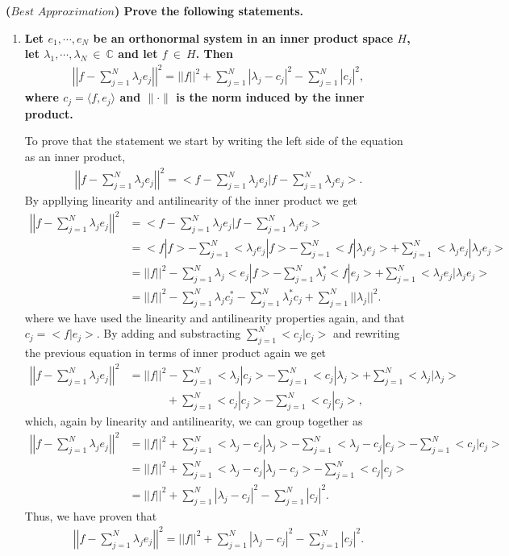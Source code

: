\textbf{($\textit{Best Approximation}$) Prove the following statements.}
\begin{enumerate}[label=(\alph*)]
\item \textbf{Let $e_1, \cdots, e_N$ be an orthonormal system in an inner product space $H$, let $\lambda_1, \cdots, \lambda_N~ \in ~ \mathbb{C}$ and let $f~\in~H$. Then
\begin{align*}
\left|\left|f-\sum_{j=1}^N\lambda_je_j\right|\right|^2=||f||^2+\sum_{j=1}^N|\lambda_j-c_j|^2-\sum_{j=1}^N|c_j|^2,
\end{align*}
where $c_j = \langle f,e_j \rangle$ and $\| \cdot \|$ is the norm induced by the inner product. }
\newline

To prove that the statement we start by writing the left side of the equation as an inner product,
\begin{align*}
\left|\left|f-\sum_{j=1}^N\lambda_je_j\right|\right|^2=<f-\sum_{j=1}^N\lambda_je_j|f-\sum_{j=1}^N\lambda_je_j>.
\end{align*}
By appllying linearity and antilinearity of the inner product we get
\begin{align*}
\left|\left|f-\sum_{j=1}^N\lambda_je_j\right|\right|^2&=<f-\sum_{j=1}^N\lambda_je_j|f-\sum_{j=1}^N\lambda_je_j>\\
&=<f|f>-\sum_{j=1}^N<\lambda_je_j|f>-\sum_{j=1}^N<f|\lambda_je_j>+\sum_{j=1}^N<\lambda_je_j|\lambda_je_j>\\
&=||f||^2-\sum_{j=1}^N\lambda_j<e_j|f>-\sum_{j=1}^N\lambda_j^*<f|e_j>+\sum_{j=1}^N<\lambda_je_j|\lambda_je_j>\\
&=||f||^2-\sum_{j=1}^N\lambda_jc_j^*-\sum_{j=1}^N\lambda_j^*c_j+\sum_{j=1}^N||\lambda_j||^2.
\end{align*}
where we have used the linearity and antilinearity properties again, and that $c_j=<f|e_j>$. By adding and substracting $\sum_{j=1}^N<c_j|c_j>$ and rewriting the previous equation in terms of inner product again we get
\begin{align*}
\left|\left|f-\sum_{j=1}^N\lambda_je_j\right|\right|^2&=||f||^2-\sum_{j=1}^N<\lambda_j|c_j>-\sum_{j=1}^N<c_j|\lambda_j>+\sum_{j=1}^N<\lambda_j|\lambda_j>\\
&~~~~~~~~~~~~~~~+\sum_{j=1}^N<c_j|c_j>-\sum_{j=1}^N<c_j|c_j>,
\end{align*}
which, again by linearity and antilinearity, we can group together as
\begin{align*}
\left|\left|f-\sum_{j=1}^N\lambda_je_j\right|\right|^2&=||f||^2+\sum_{j=1}^N<\lambda_j-c_j|\lambda_j>-\sum_{j=1}^N<\lambda_j-c_j|c_j>-\sum_{j=1}^N<c_j|c_j>\\
&=||f||^2+\sum_{j=1}^N<\lambda_j-c_j|\lambda_j-c_j>-\sum_{j=1}^N<c_j|c_j>\\
&=||f||^2+\sum_{j=1}^N|\lambda_j-c_j|^2-\sum_{j=1}^N|c_j|^2.
\end{align*}
Thus, we have proven that
\begin{align*}
\left|\left|f-\sum_{j=1}^N\lambda_je_j\right|\right|^2=||f||^2+\sum_{j=1}^N|\lambda_j-c_j|^2-\sum_{j=1}^N|c_j|^2.
\end{align*}


\end{enumerate}
